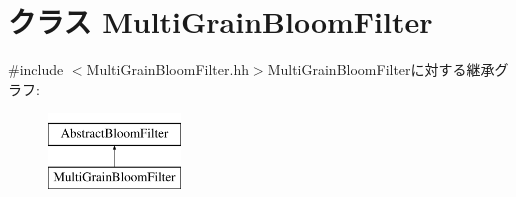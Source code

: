 \hypertarget{classMultiGrainBloomFilter}{
\section{クラス MultiGrainBloomFilter}
\label{classMultiGrainBloomFilter}
}


{\ttfamily \#include $<$MultiGrainBloomFilter.hh$>$}MultiGrainBloomFilterに対する継承グラフ:\begin{figure}[H]
\begin{center}
\leavevmode
\includegraphics[height=2cm]{classMultiGrainBloomFilter}
\end{center}
\end{figure}

